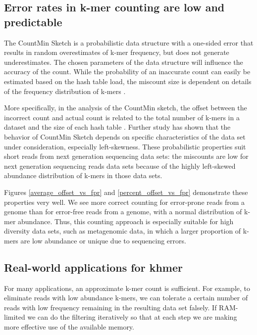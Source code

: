 \documentclass{article}
\begin{document}
\subsection{Error rates in k-mer counting are low and predictable}

The CountMin Sketch is a probabilistic data structure with a
one-sided error that results in random overestimates of k-mer
frequency, but does not generate underestimates. The chosen parameters
of the data structure will influence the accuracy of the count.  While
the probability of an inaccurate count can easily be estimated based
on the hash table load, the miscount size is dependent on details of
the frequency distribution of k-mers \cite{Cormode2005}.

More specifically, in the analysis of the CountMin
sketch, the offset between the incorrect count and
actual count is related to the total number of k-mers in a dataset and
the size of each hash table \cite{Cormode2005}. Further study has shown that the behavior
of CountMin Sketch depends on specific characteristics of the data
set under consideration, especially left-skewness\cite{Rusu2008,
  CormodeM05}.  These probabilistic properties suit short reads
from next generation sequencing data sets: the miscounts are
low for next generation sequencing reads data sets because of the
highly left-skewed abundance distribution of k-mers in those data sets.

Figures \ref{average_offset_vs_fpr} and \ref{percent_offset_vs_fpr}
demonstrate these properties very well.  We see more correct
counting for error-prone reads from a genome than for error-free
reads from a genome, with a normal
distribution of k-mer abundance.  Thus, this counting approach is
especially suitable for high diversity data sets, such as metagenomic
data, in which a larger proportion of k-mers are low abundance or
unique due to sequencing errors.

\subsection{Real-world applications for khmer}

For many applications, an approximate k-mer count is sufficient.  For
example, to eliminate reads with low abundance k-mers, we
can tolerate a certain number of reads with low frequency remaining in
the resulting data set falsely.  If RAM-limited we can do the
filtering iteratively so that at each step we are making more
effective use of the available memory.
\end{document}
